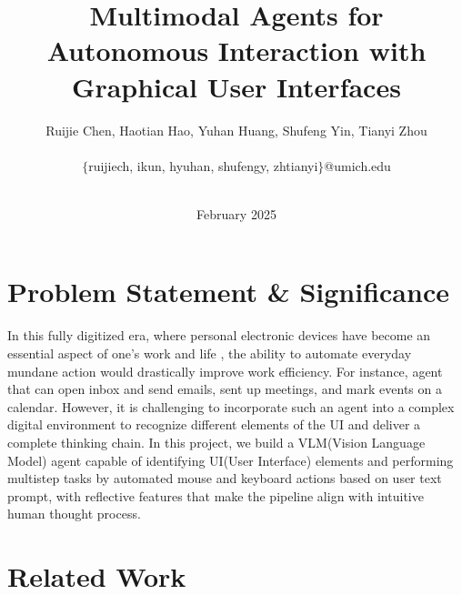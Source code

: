 \documentclass[11pt,letterpaper]{article}
\begin{document}
\title{Multimodal Agents for Autonomous Interaction with Graphical User Interfaces}

\author{%
Ruijie Chen, Haotian Hao, Yuhan Huang, Shufeng Yin, Tianyi Zhou\\
{\small\begin{minipage}{\linewidth}\begin{center}
\begin{tabular}{ccc}
    $\{$ruijiech, ikun, hyuhan, shufengy, zhtianyi$\}$@umich.edu
\end{tabular}
\end{center}\end{minipage}}\\
}

%

\date{February 2025}


\maketitle





\section{Problem Statement \& Significance}


In this fully digitized era, where personal electronic devices have become an essential aspect of one's work and life , the ability to automate everyday mundane action would drastically improve work efficiency. For instance, agent that can open inbox and send emails, sent up meetings, and mark events on a calendar. However, it is challenging to incorporate such an agent into a complex digital environment to recognize different elements of the UI and deliver a complete thinking chain. In this project, we build a VLM(Vision Language Model) agent capable of identifying UI(User Interface) elements and performing multistep tasks by automated mouse and keyboard actions based on user text prompt, with reflective features that make the pipeline align with intuitive human thought process.


\section{Related Work}
\end{document}
